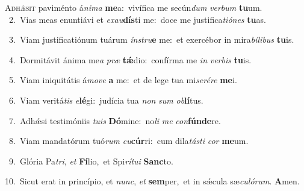 \lettrine{\initial\textcolor{\initialcolor}{A}}{dhǽsit} paviménto á\-\textit{ni}\-\textit{ma} \textbf{me}\-a:~\star vivífica me secún\textit{dum} \textit{ver}\-\textit{bum} \textbf{tu}\-um.\\
{\numbfont\textcolor{\numbcolor}{~2.}}~Vias meas enuntiávi et \textit{ex}\-\textit{au}\textbf{dís}ti me:~\star doce me justifica\-\textit{ti}\-\textit{ó}\textit{nes} \textbf{tu}\-as.\par
{\numbfont\textcolor{\numbcolor}{~3.}}~Viam justificatiónum tuárum \textit{ín}\-\textit{stru}\textbf{e} me:~\star et exercébor in mira\-\textit{bí}\-\textit{li}\textit{bus} \textbf{tu}\-is.\par
{\numbfont\textcolor{\numbcolor}{~4.}}~Dormitávit ánima me\textit{a} \textit{præ} \textbf{tǽ}\-dio:~\star confírma me \textit{in} \textit{ver}\-\textit{bis} \textbf{tu}\-is.\par
{\numbfont\textcolor{\numbcolor}{~5.}}~Viam iniquitátis á\-\textit{mo}\-\textit{ve} \textbf{a} me:~\star et de lege tua mi\-\textit{se}\-\textit{ré}\textit{re} \textbf{me}\-i.\par
{\numbfont\textcolor{\numbcolor}{~6.}}~Viam veritá\textit{tis} \textit{e}\-\textbf{lé}gi:~\star judícia tua \textit{non} \textit{sum} \textit{ob}\-\textbf{lí}tus.\par
{\numbfont\textcolor{\numbcolor}{~7.}}~Adhǽsi testimóniis \textit{tu}\-\textit{is} \textbf{Dó}\-mine:~\star no\textit{li} \textit{me} \textit{con}\-\textbf{fún}\textbf{de}re.\par
{\numbfont\textcolor{\numbcolor}{~8.}}~Viam mandatórum tuó\textit{rum} \textit{cu}\-\textbf{cúr}ri:~\star cum dila\-\textit{tás}\-\textit{ti} \textit{cor} \textbf{me}\-um.\par
{\numbfont\textcolor{\numbcolor}{~9.}}~Glória Pa\-\textit{tri}\-, \textit{et} \textbf{Fí}\-lio,~\star et Spi\-\textit{rí}\-\textit{tu}\textit{i} \textbf{Sanc}\-to.\par
{\numbfont\textcolor{\numbcolor}{10.}}~Sicut erat in princípio, et \textit{nunc}\-, \textit{et} \textbf{sem}\-per,~\star et in sǽcula sæ\-\textit{cu}\-\textit{ló}\textit{rum}. \textbf{A}\-men.\par
